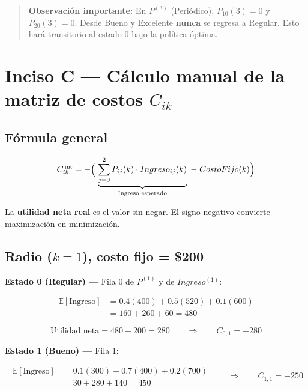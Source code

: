 \documentclass[12pt,a4paper]{article}
\begin{document}
\vspace{0.3cm}
\begin{quote}
\textbf{Observación importante:} En $P^{(3)}$ (Periódico), $P_{10}(3)=0$ y $P_{20}(3)=0$. Desde Bueno y Excelente \textbf{nunca} se regresa a Regular. Esto hará transitorio al estado 0 bajo la política óptima.
\end{quote}

\newpage

\section{Inciso C --- Cálculo manual de la matriz de costos $C_{ik}$}

\subsection*{Fórmula general}

\[
C_{ik}^{\,\text{int}} = -\Bigl(\; \underbrace{\sum_{j=0}^{2} P_{ij}(k) \cdot Ingreso_{ij}(k)}_{\text{Ingreso esperado}} \;-\; CostoFijo(k) \Bigr)
\]

La \textbf{utilidad neta real} es el valor sin negar. El signo negativo convierte maximización en minimización.

\subsection*{Radio ($k = 1$), costo fijo = \$200}

\vspace{0.2cm}
\textbf{Estado 0 (Regular) ---} Fila 0 de $P^{(1)}$ y de $Ingreso^{(1)}$:

\[
\begin{aligned}
\mathbb{E}[\text{Ingreso}] &= 0.4(400) + 0.5(520) + 0.1(600) \\
&= 160 + 260 + 60 = 480
\end{aligned}
\]

\[
\text{Utilidad neta} = 480 - 200 = 280
\qquad\Longrightarrow\qquad
\boxed{C_{0,1} = -280}
\]

\vspace{0.3cm}
\textbf{Estado 1 (Bueno) ---} Fila 1:

\[
\begin{aligned}
\mathbb{E}[\text{Ingreso}] &= 0.1(300) + 0.7(400) + 0.2(700) \\
&= 30 + 280 + 140 = 450
\end{aligned}
\qquad\Longrightarrow\qquad
\boxed{C_{1,1} = -250}
\]
\end{document}
